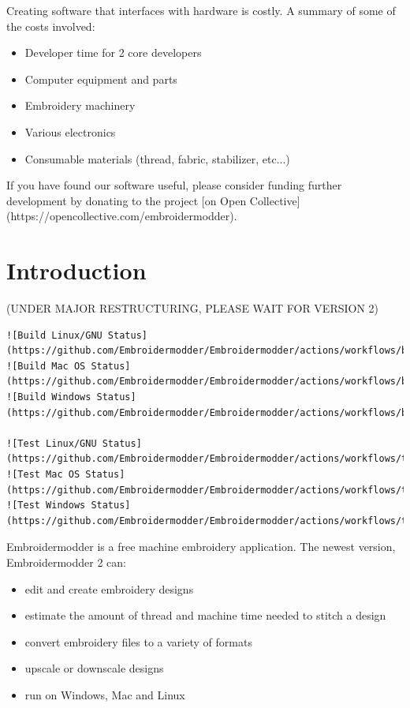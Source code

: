 \documentclass[a4paper, 11pt]{report}
\begin{document}
Creating software that interfaces with hardware is costly. A summary of some of the costs involved:
     
\begin{itemize}               
\item Developer time for 2 core developers
\item Computer equipment and parts
\item Embroidery machinery
\item Various electronics
\item Consumable materials (thread, fabric, stabilizer, etc...)
\end{itemize}

If you have found our software useful, please consider funding further development by donating to the project [on Open Collective](https://opencollective.com/embroidermodder).

\section{Introduction}

(UNDER MAJOR RESTRUCTURING, PLEASE WAIT FOR VERSION 2)

\begin{verbatim}
![Build Linux/GNU Status](https://github.com/Embroidermodder/Embroidermodder/actions/workflows/build_linux_gnu.yml/badge.svg)
![Build Mac OS Status](https://github.com/Embroidermodder/Embroidermodder/actions/workflows/build_macos.yml/badge.svg)
![Build Windows Status](https://github.com/Embroidermodder/Embroidermodder/actions/workflows/build_windows.yml/badge.svg)

![Test Linux/GNU Status](https://github.com/Embroidermodder/Embroidermodder/actions/workflows/test_linux_gnu.yml/badge.svg)
![Test Mac OS Status](https://github.com/Embroidermodder/Embroidermodder/actions/workflows/test_macos.yml/badge.svg)
![Test Windows Status](https://github.com/Embroidermodder/Embroidermodder/actions/workflows/test_windows.yml/badge.svg)
\end{verbatim}

Embroidermodder is a free machine embroidery application.
The newest version, Embroidermodder 2 can:

\begin{itemize}
\item edit and create embroidery designs
\item estimate the amount of thread and machine time needed to stitch a design
\item convert embroidery files to a variety of formats
\item upscale or downscale designs
\item run on Windows, Mac and Linux
\end{itemize}
\end{document}
